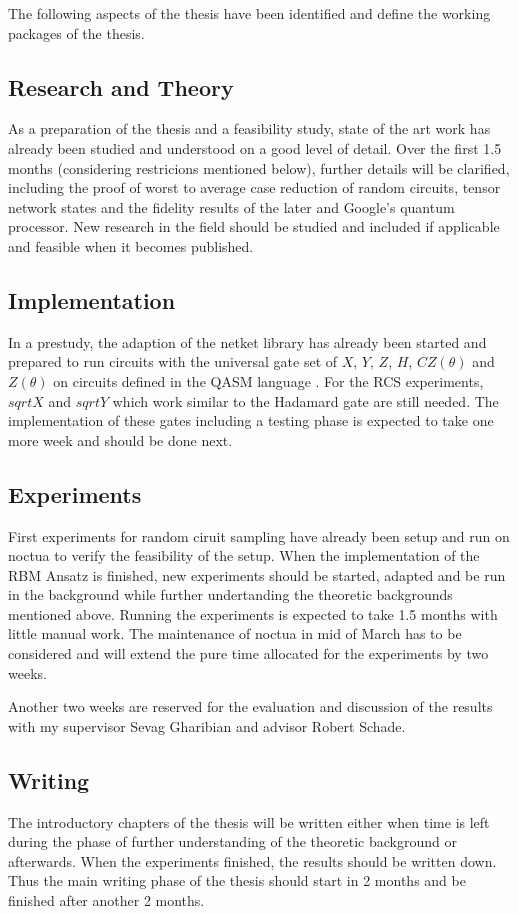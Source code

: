 The following aspects of the thesis have been identified and define the working packages of the thesis.

\subsection{Research and Theory}
As a preparation of the thesis and a feasibility study, state of the art work has already been studied 
and understood on a good level of detail. Over the first 1.5 months (considering restricions mentioned below), further details will be clarified, including 
the proof of worst to average case reduction of random circuits, tensor network states and the fidelity results 
of the later and Google's quantum processor. New research in the field should be studied and included if applicable and feasible when it becomes published.

\subsection{Implementation}
In a prestudy, the adaption of the netket library has already been started and prepared to run circuits with 
the universal gate set of $X$, $Y$, $Z$, $H$, $CZ(\theta)$ and $Z(\theta)$ on circuits defined in the QASM language \cite{cross2017open}. For the RCS experiments, $sqrtX$ and $sqrtY$ which work similar to the Hadamard gate are still 
needed. The implementation of these gates including a testing phase is expected to take one more week and should
be done next.

\subsection{Experiments}
First experiments for random ciruit sampling have already been setup and run on noctua to verify the feasibility of
the setup. When the implementation of the RBM Ansatz is finished, new experiments should be started, adapted and be run in the 
background while further undertanding the theoretic backgrounds mentioned above. Running the experiments is expected 
to take 1.5 months with little manual work. The maintenance of noctua in mid of March has to be considered
and will extend the pure time allocated for the experiments by two weeks.

Another two weeks are reserved for the evaluation and discussion of the results with my supervisor Sevag Gharibian and advisor Robert Schade.

\subsection{Writing}
The introductory chapters of the thesis will be written either when time is left during the phase of further 
understanding of the theoretic background or afterwards. When the experiments finished, the results should be written
down. Thus the main writing phase of the thesis should start in 2 months and be finished after another 2 months.

